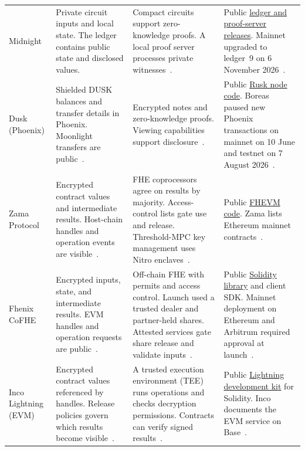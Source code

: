 \begin{longtable}{>{\raggedright\arraybackslash}m{}>{\raggedright\arraybackslash}m{}>{\raggedright\arraybackslash}m{}>{\raggedright\arraybackslash}m{}}
\addlinespace[3pt]
Midnight & Private circuit inputs and local state. The ledger contains public state and disclosed values. & Compact circuits support zero-knowledge proofs. A local proof server processes private witnesses~\cite{platform-midnight2026}. & Public \href{https://github.com/midnightntwrk/midnight-ledger/releases}{ledger and proof-server releases}. Mainnet upgraded to ledger~9 on 6 November 2026~\cite{platform-midnight-ledger9}. \\
\addlinespace[3pt]
Dusk (Phoenix) & Shielded DUSK balances and transfer details in Phoenix. Moonlight transfers are public~\cite{platform-dusk2026}. & Encrypted notes and zero-knowledge proofs. Viewing capabilities support disclosure~\cite{platform-dusk2026}. & Public \href{https://github.com/dusk-network/rusk}{Rusk node code}. Boreas paused new Phoenix transactions on mainnet on 10 June and testnet on 7 August 2026~\cite{platform-dusk-boreas2026}. \\
\addlinespace[3pt]
Zama Protocol & Encrypted contract values and intermediate results. Host-chain handles and operation events are visible~\cite{platform-zama2026}. & FHE coprocessors agree on results by majority. Access-control lists gate use and release. Threshold-MPC key management uses Nitro enclaves~\cite{platform-zama2026}. & Public \href{https://github.com/zama-ai/fhevm}{FHEVM code}. Zama lists Ethereum mainnet contracts~\cite{platform-zama-mainnet}. \\
\addlinespace[3pt]
Fhenix CoFHE & Encrypted inputs, state, and intermediate results. EVM handles and operation requests are public~\cite{platform-cofhe2026}. & Off-chain FHE with permits and access control. Launch used a trusted dealer and partner-held shares. Attested services gate share release and validate inputs~\cite{platform-cofhe-mainnet-trust}. & Public \href{https://github.com/FhenixProtocol/cofhe-contracts}{Solidity library} and client SDK. Mainnet deployment on Ethereum and Arbitrum required approval at launch~\cite{platform-cofhe-mainnet}. \\
\addlinespace[3pt]
Inco Lightning (EVM) & Encrypted contract values referenced by handles. Release policies govern which results become visible~\cite{platform-inco-decryption}. & A trusted execution environment (TEE) runs operations and checks decryption permissions. Contracts can verify signed results~\cite{platform-inco2026,platform-inco-decryption}. & Public \href{https://github.com/Inco-fhevm/lightning-rod}{Lightning development kit} for Solidity. Inco documents the EVM service on Base~\cite{platform-inco-mainnet}. \\

\end{longtable}
